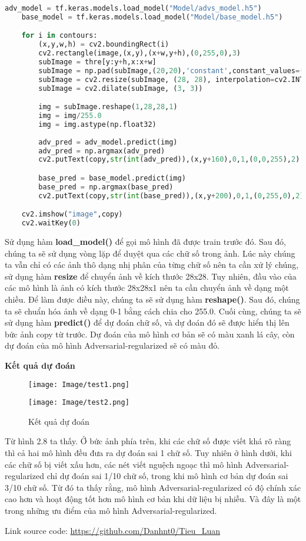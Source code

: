 \begin{lstlisting}[language = Python]
    adv_model = tf.keras.models.load_model("Model/advs_model.h5")
    base_model = tf.keras.models.load_model("Model/base_model.h5")

    for i in contours:
        (x,y,w,h) = cv2.boundingRect(i)
        cv2.rectangle(image,(x,y),(x+w,y+h),(0,255,0),3)
        subImage = thre[y:y+h,x:x+w]
        subImage = np.pad(subImage,(20,20),'constant',constant_values=(0,0))
        subImage = cv2.resize(subImage, (28, 28), interpolation=cv2.INTER_AREA)
        subImage = cv2.dilate(subImage, (3, 3))

        img = subImage.reshape(1,28,28,1)
        img = img/255.0
        img = img.astype(np.float32)
        
        adv_pred = adv_model.predict(img)
        adv_pred = np.argmax(adv_pred)
        cv2.putText(copy,str(int(adv_pred)),(x,y+160),0,1,(0,0,255),2)

        base_pred = base_model.predict(img)
        base_pred = np.argmax(base_pred)
        cv2.putText(copy,str(int(base_pred)),(x,y+200),0,1,(0,255,0),2)

    cv2.imshow("image",copy)
    cv2.waitKey(0)


\end{lstlisting}

Sử dụng hàm \textbf{load\_model()} để gọi mô hình đã được train trước đó. Sau đó, chúng ta sẽ sử dụng vòng lặp để duyệt qua các chữ số trong ảnh.
Lúc này chúng ta vẫn chỉ có các ảnh thô dạng nhị phân của từng chữ số nên ta cần xử lý chúng, sử dụng hàm \textbf{resize} để chuyển ảnh về kích thước 28x28.
Tuy nhiên, đầu vào của các mô hình là ảnh có kích thước 28x28x1 nên ta cần chuyển ảnh về dạng một chiều. Để làm được điều này, chúng ta sẽ sử dụng hàm \textbf{reshape()}.
Sau đó, chúng ta sẽ chuẩn hóa ảnh về dạng 0-1 bằng cách chia cho 255.0. Cuối cùng, chúng ta sẽ sử dụng hàm \textbf{predict()} để dự đoán chữ số, và dự đoán đó sẽ được hiển 
thị lên bức ảnh copy từ trước. Dự đoán của mô hình cơ bản sẽ có màu xanh lá cây, còn dự đoán của mô hình Adversarial-regularized sẽ có màu đỏ.

\textbf{Kết quả dự đoán}

\begin{figure}[h]
    \centering
    \texttt{[image: Image/test1.png]}

    \texttt{[image: Image/test2.png]}
    \caption{Kết quả dự đoán}
    \label{fig 2.8:Kết quả dự đoán}
\end{figure}

Từ hình 2.8 ta thấy. Ở bức ảnh phía trên, khi các chữ số được viết khá rõ ràng thì cả hai mô hình đều đưa ra dự đoán sai 1 chữ số.
Tuy nhiên ở hình dưới, khi các chữ số bị viết xấu hơn, các nét viết nguệch ngoạc thì mô hình Adversarial-regularized chỉ dự đoán sai 1/10 chữ số, trong khi mô hình cơ bản dự đoán sai 3/10 chữ số.
Từ đó ta thấy rằng, mô hình Adversarial-regularized có độ chính xác cao hơn và hoạt động tốt hơn mô hình cơ bản khi dữ liệu bị nhiễu. Và đây là một trong những ưu điểm của mô hình Adversarial-regularized.


Link source code: \url{https://github.com/Danhnt0/Tieu_Luan}